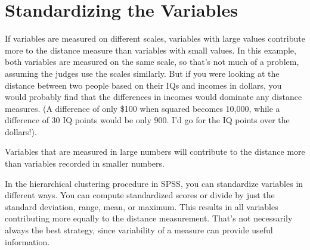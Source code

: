 \documentclass[]{report}
\begin{document}
\section{Standardizing the Variables}
If variables are measured on different scales, variables with large values contribute
more to the distance measure than variables with small values. In this example, both
variables are measured on the same scale, so that’s not much of a problem, assuming
the judges use the scales similarly. But if you were looking at the distance between two
people based on their IQs and incomes in dollars, you would probably find that the
differences in incomes would dominate any distance measures. (A difference of only
\$100 when squared becomes 10,000, while a difference of 30 IQ points would be only
900. I’d go for the IQ points over the dollars!).

Variables that are measured in large numbers will contribute to the distance more than variables recorded in smaller
numbers.

In the hierarchical clustering procedure in SPSS, you can standardize variables in
different ways. You can compute standardized scores or divide by just the standard
deviation, range, mean, or maximum. This results in all variables contributing more
equally to the distance measurement. That’s not necessarily always the best strategy,
since variability of a measure can provide useful information. 
\end{document}
